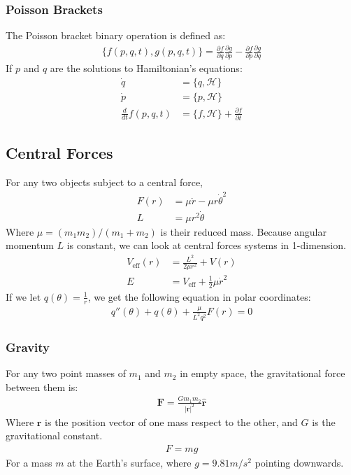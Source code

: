 \documentclass[11pt, letterpaper]{article}
\newcommand{\Hami}{\mathcal{H}}	       %
\newcommand{\ve}[1]{
  \ensuremath{\bm{#1}}}	               %
\newcommand{\uve}[1]{
  \ensuremath{\bm{\hat{#1}}}}          %
\newcommand{\pd}[2]{
  \ensuremath{
    \frac{\partial #1}{\partial #2} }} %
\begin{document}
\begin{multicols*}{3}
\subsubsection{Poisson Brackets}
The Poisson bracket binary operation is defined as:
\begin{align*}
  \{ f(p, q, t), g(p, q, t) \} = \pd{f}{q}\pd{g}{p} - \pd{f}{p}\pd{g}{q}  
\end{align*}
If $p$ and $q$ are the solutions to Hamiltonian's equations:
\begin{align*}
  \dot{q} &= \{q, \Hami \} \\
  \dot{p} &= \{p, \Hami \} \\
  \frac{d}{dt} f(p, q, t) &= \{f, \Hami\} + \pd{f}{t}
\end{align*}
\subsection{Central Forces}
For any two objects subject to a central force,
\begin{align*}
  F(r) &= \mu \ddot{r} - \mu r \dot{\theta}^2\\
  L &= \mu r^2\dot{\theta}
\end{align*}
Where $\mu = (m_1 m_2)/(m_1 + m_2)$ is their reduced mass. Because angular
momentum $L$ is constant, we can look at central forces systems in 1-dimension.
\begin{align*}
  V_{\text{eff}}(r) &= \frac{L^2}{2 \mu r^2} + V(r) \\
  E &= V_{\text{eff}} + \frac{1}{2} \mu \dot{r}^2
\end{align*}
If we let $q(\theta) = \frac{1}{r}$, we get the following equation in polar
coordinates:
\begin{align*}
  q''(\theta) + q(\theta) + \frac{\mu}{L^2 q^2} F(r) = 0
\end{align*}
\subsubsection{Gravity}
For any two point masses of $m_1$ and $m_2$ in empty space, the gravitational
force between them is:
\begin{align*}
  \ve{F}=\frac{Gm_1m_2}{|\ve{r}|^2}\uve{r}
\end{align*}
Where $\ve{r}$ is the position vector of one mass respect to the other, and $G$
is the gravitational constant.
\begin{align*}
  F=mg
\end{align*}
\noindent For a mass $m$ at the Earth's surface, where $g=9.81m/s^2$ pointing
downwards.

\end{multicols*}
\end{document}
